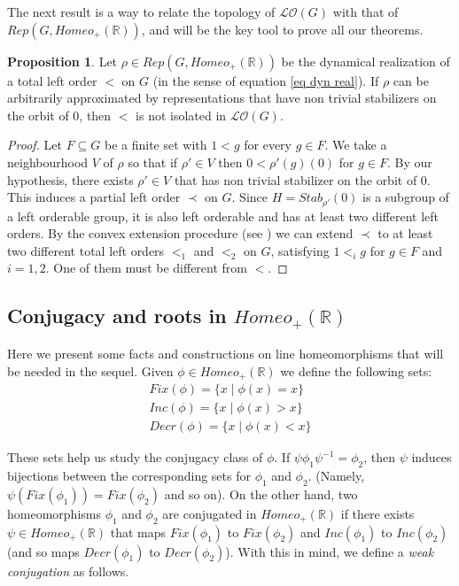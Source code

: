 \documentclass[12pt]{article}
\newcommand{\R}{\mathbb{R}}
\theoremstyle{definition}
\newtheorem{prop}[thm]{Proposition}
\begin{document}
The next result is a way to relate the topology of $\mathcal{LO}(G)$ with that of $Rep(G,Homeo_{+}(\R))$, and will be the key tool to prove all our theorems.

\begin{prop} \label{aislado} Let $\rho\in Rep(G,Homeo_{+}(\R))$ be the dynamical realization of a total left order $<$ on $G$ (in the sense of equation \ref{eq dyn real}). If $\rho$ can be arbitrarily approximated by representations that have non trivial stabilizers on the orbit of $0$, then $<$ is not isolated in $\mathcal{LO}(G)$. 
\end{prop}
\begin{proof} Let $F\subseteq G$ be a finite set with $1<g$ for every $g\in F$. We take a neighbourhood $V$ of $\rho$ so that if $\rho'\in V$ then $0<\rho'(g)(0)$ for $g\in F$. By our hypothesis, there exists $\rho'\in V$ that has non trivial stabilizer on the orbit of $0$. This induces a partial left order $\prec$ on $G$. Since $H=Stab_{\rho'}(0)$ is a subgroup of a left orderable group, it is also left orderable and has at least two different left orders. By the convex extension procedure (see \cite[\S2.1]{GOD}) we can extend $\prec$ to at least two different total left orders $<_1$ and $<_2$ on $G$, satisfying $1 <_i g$ for $g\in F$ and $i=1,2$. One of them must be different from $<$.
\end{proof}

\subsection{Conjugacy and roots in $Homeo_{+}(\R)$}

Here we present some facts and constructions on line homeomorphisms that will be needed in the sequel. Given $\phi\in Homeo_{+}(\R)$ we define the following sets:
\[\begin{aligned}
    Fix(\phi)=\{x\mid \phi(x)=x\} \\
    Inc(\phi)=\{x\mid \phi(x)>x\} \\
    Decr(\phi)=\{x\mid \phi(x)<x\}
  \end{aligned}\]
  
These sets help us study the conjugacy class of $\phi$. If $\psi\phi_1\psi^{-1}=\phi_2$, then $\psi$ induces bijections between the corresponding sets for $\phi_1$ and $\phi_2$. (Namely, $\psi(Fix(\phi_1))=Fix(\phi_2)$ and so on). On the other hand, two homeomorphisms $\phi_1$ and $\phi_2$ are conjugated in $Homeo_{+}(\R)$ if there exists $\psi\in Homeo_+(\R)$ that maps $Fix(\phi_1)$ to $Fix(\phi_2)$ and $Inc(\phi_1)$ to $Inc(\phi_2)$ (and so maps $Decr(\phi_1)$ to $Decr(\phi_2)$). With this in mind, we define a {\em weak conjugation} as follows.
\end{document}
